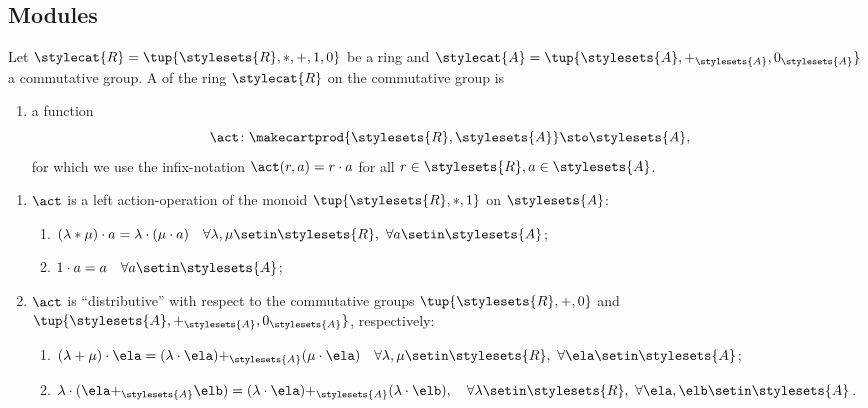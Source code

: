     \subsection{Modules}


\begin{ctdefinition}
    \label{def:left-ring-action-operation}
    Let $\stylecat{R} = \tup{\stylesets{R}, *, +, 1, 0}$  be a ring and $\stylecat{A} = \tup{\stylesets{A}, \mathbf{+}_{\stylesets{A}}, \text{0}_\stylesets{A} }$ a commutative group. 
    A  of the ring $\stylecat{R}$ on the commutative group  is 
    \begin{body}
        \constit
        \begin{enumerate}
            \item a function
            \begin{equation}
                  \label{eq:lact-ring}
                  \act \colon \makecartprod{\stylesets{R}, \stylesets{A}} \sto \stylesets{A},
              \end{equation}
              for which we use the infix-notation $\act(r, a) =  r \cdot a$ for all $r \in \stylesets{R}, a \in \stylesets{A}$. 
            \end{enumerate}
        \condit
        \begin{enumerate}
            \item $\act$ is a left action-operation of the monoid $\tup{\stylesets{R}, *, 1}$ on $\stylesets{A}$:
            \begin{enumerate}
                      \item $(\lambda * \mu) \cdot a = \lambda \cdot( \mu \cdot a) \quad \forall \lambda, \mu \setin \stylesets{R}, \ \forall a \setin \stylesets{A}$;
                      \item $1 \cdot a = a \quad \forall a \setin \stylesets{A}$;
            \end{enumerate}
            \item $\act$ is ``distributive'' with respect to the commutative groups $\tup{\stylesets{R}, +, 0}$ and $\tup{\stylesets{A}, \mathbf{+}_\stylesets{A}, \text{0}_\stylesets{A}}$,  respectively:
            \begin{enumerate}
                                        \item $(\lambda + \mu) \cdot \ela = (\lambda \cdot \ela) \mathbf{+}_\stylesets{A} (\mu \cdot \ela) \quad \forall \lambda, \mu \setin \stylesets{R}, \ \forall \ela \setin \stylesets{A}$;
                      \item $\lambda \cdot (\ela \mathbf{+}_\stylesets{A} \elb) = (\lambda \cdot \ela) \mathbf{+}_\stylesets{A} (\lambda \cdot \elb), \quad \forall \lambda \setin \stylesets{R}, \ \forall \ela, \elb \setin \stylesets{A}$.
                  \end{enumerate}
        \end{enumerate}
    \end{body}
\end{ctdefinition}



